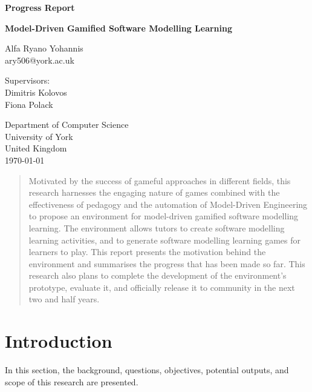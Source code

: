 \documentclass[10pt, a4paper]{report} \usepackage[titletoc]{appendix}
\begin{document}
\begin{titlepage}
 \begin{center}

\textbf{Progress Report}
\vspace{1cm}

\textbf{\large Model-Driven Gamified Software Modelling Learning}
\vspace{1cm}

Alfa Ryano Yohannis\\
ary506@york.ac.uk
\vspace{1cm}

Supervisors:\\
Dimitris Kolovos\\
Fiona Polack\\
\vspace{1cm}

Department of Computer Science\\
University of York\\
United Kingdom\\
\vspace{1cm}
\today
 
\vfill
 
\end{center}
\end{titlepage}


\begin{abstract}
Motivated by the success of gameful approaches in different fields, this research harnesses the engaging nature of games combined with the effectiveness of pedagogy and the automation of Model-Driven Engineering to propose an environment for model-driven gamified software modelling learning. The environment allows tutors to create software modelling learning activities, and to generate software modelling learning games for learners to play. This report presents the motivation behind the environment and summarises the progress that has been made so far. This research also plans to complete the development of the environment's prototype, evaluate it, and officially release it to community in the next two and half years.
\end{abstract}

\tableofcontents
{}

\listoffigures
\newpage
 
\listoftables
\newpage

\lstlistoflistings
\newpage

\chapter{Introduction}
\label{Introduction}
In this section, the background, questions, objectives, potential outputs, and scope of this research are presented.
\end{document}
